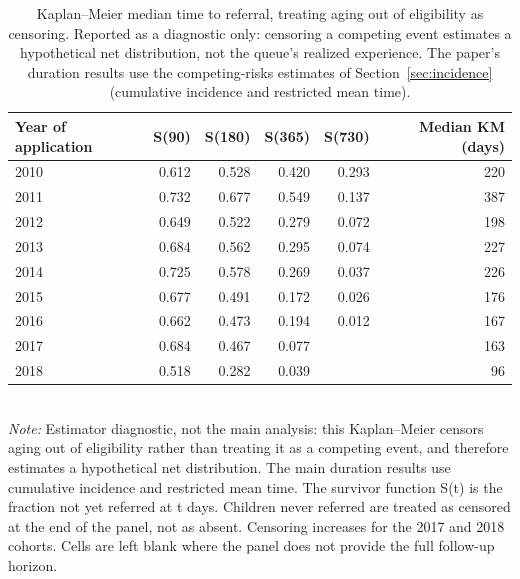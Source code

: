 \begin{table}[htbp]\centering
\caption{Kaplan--Meier median time to referral, treating aging out of eligibility as
censoring. Reported as a diagnostic only: censoring a competing event estimates a
hypothetical net distribution, not the queue's realized experience. The
paper's duration results use the competing-risks estimates of
Section~\ref{sec:incidence} (cumulative incidence and restricted mean time).}
\label{tab:R2b_km}
\small
\begin{tabular}{lrrrrr}
\toprule
Year of application & S(90) & S(180) & S(365) & S(730) & Median KM (days) \\
\midrule
2010 & 0.612 & 0.528 & 0.420 & 0.293 & 220 \\
2011 & 0.732 & 0.677 & 0.549 & 0.137 & 387 \\
2012 & 0.649 & 0.522 & 0.279 & 0.072 & 198 \\
2013 & 0.684 & 0.562 & 0.295 & 0.074 & 227 \\
2014 & 0.725 & 0.578 & 0.269 & 0.037 & 226 \\
2015 & 0.677 & 0.491 & 0.172 & 0.026 & 176 \\
2016 & 0.662 & 0.473 & 0.194 & 0.012 & 167 \\
2017 & 0.684 & 0.467 & 0.077 &  & 163 \\
2018 & 0.518 & 0.282 & 0.039 &  & 96 \\
\bottomrule
\end{tabular}
\\[3pt]{\footnotesize \textit{Note:} Estimator diagnostic, not the main analysis: this Kaplan--Meier censors aging out of eligibility rather than treating it as a competing event, and therefore estimates a hypothetical net distribution. The main duration results use cumulative incidence and restricted mean time. The survivor function S(t) is the fraction not yet referred at t days. Children never referred are treated as censored at the end of the panel, not as absent. Censoring increases for the 2017 and 2018 cohorts. Cells are left blank where the panel does not provide the full follow-up horizon.}
\end{table}
